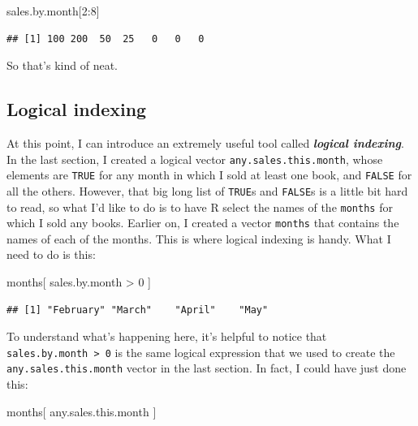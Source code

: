 \documentclass[
]{book}
\newenvironment{Shaded}{\begin{snugshade}}{\end{snugshade}}
\newcommand{\DecValTok}[1]{\textcolor[rgb]{0.00,0.00,0.81}{#1}}
\newcommand{\NormalTok}[1]{#1}
\newcommand{\SpecialCharTok}[1]{\textcolor[rgb]{0.00,0.00,0.00}{#1}}
\begin{document}
\begin{Shaded}
\begin{Highlighting}[]
\NormalTok{sales.by.month[}\DecValTok{2}\SpecialCharTok{:}\DecValTok{8}\NormalTok{]}
\end{Highlighting}
\end{Shaded}

\begin{verbatim}
## [1] 100 200  50  25   0   0   0
\end{verbatim}

So that's kind of neat.

\hypertarget{logical-indexing}{%
\subsection{Logical indexing}\label{logical-indexing}}

At this point, I can introduce an extremely useful tool called \textbf{\emph{logical indexing}}. In the last section, I created a logical vector \texttt{any.sales.this.month}, whose elements are \texttt{TRUE} for any month in which I sold at least one book, and \texttt{FALSE} for all the others. However, that big long list of \texttt{TRUE}s and \texttt{FALSE}s is a little bit hard to read, so what I'd like to do is to have R select the names of the \texttt{months} for which I sold any books. Earlier on, I created a vector \texttt{months} that contains the names of each of the months. This is where logical indexing is handy. What I need to do is this:

\begin{Shaded}
\begin{Highlighting}[]
\NormalTok{months[ sales.by.month }\SpecialCharTok{\textgreater{}} \DecValTok{0}\NormalTok{ ]}
\end{Highlighting}
\end{Shaded}

\begin{verbatim}
## [1] "February" "March"    "April"    "May"
\end{verbatim}

To understand what's happening here, it's helpful to notice that \texttt{sales.by.month\ \textgreater{}\ 0} is the same logical expression that we used to create the \texttt{any.sales.this.month} vector in the last section. In fact, I could have just done this:

\begin{Shaded}
\begin{Highlighting}[]
\NormalTok{months[ any.sales.this.month ]}
\end{Highlighting}
\end{Shaded}
\end{document}
